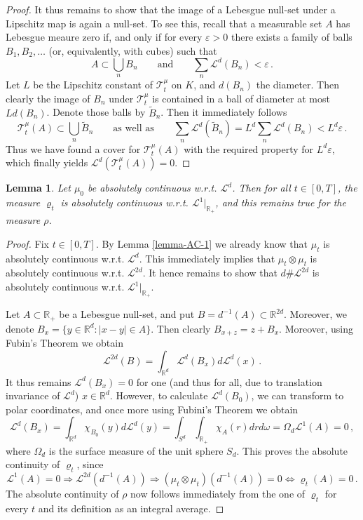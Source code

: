 \documentclass[A4paper,11pt]{article}
\newtheorem{lemma}[theorem]{Lemma}
\theoremstyle{definition}
\newcommand{\R}{\mathbb{R}}
\newcommand{\cl}{\mathcal{L}}
\newcommand{\ct}{\mathcal{T}}
\begin{document}
\begin{proof}
	It thus remains to show that the image of a Lebesgue null-set under a Lipschitz map is again a null-set. To see this,
	recall that a measurable set $A$ has Lebesgue meaure zero if, and only if for every $\varepsilon>0$ there exists a
	family of balls $B_1,B_2,\ldots$ (or, equivalently, with cubes) such that
	\[
		A\subset\bigcup_n B_n\qquad\text{and}\qquad\sum_n\cl^d(B_n)<\varepsilon\,.
	\]
	Let $L$ be the Lipschitz constant of $\ct^\mu_t$ on $K$, and $d(B_n)$ the diameter. Then clearly the image of
	$B_n$ under $\ct^\mu_t$ is contained in a ball of diameter at most $Ld(B_n)$. Denote those balls by
	$\widetilde B_n$.
	Then it immediately follows
	\[
		\ct^\mu_t(A)\subset\bigcup_n\widetilde B_n\qquad\text{as well as}\qquad
		\sum_n\cl^d(\widetilde B_n)=L^d\sum_n\cl^d(B_n)<L^d\varepsilon\,.
	\]
	Thus we have found a cover for $\ct^\mu_t(A)$ with the required property for $L^d\varepsilon$, which finally
	yields $\cl^d(\ct^\mu_t(A))=0$.
\end{proof}

\begin{lemma}
	Let $\mu_0$ be absolutely continuous w.r.t. $\cl^d$. Then for all $t\in [0,T]$, the measure $\varrho_t$ is absolutely
	continuous w.r.t. $\cl^1|_{\R_+}$, and this remains true for the measure $\rho$.
\end{lemma}

\begin{proof}
	Fix $t\in [0,T]$. By Lemma \ref{lemma-AC-1} we already know that $\mu_t$ is absolutely continuous w.r.t.
	$\cl^d$. This immediately implies that $\mu_t\otimes\mu_t$ is absolutely continuous w.r.t. $\cl^{2d}$. It hence
	remains to show that $d\#\cl^{2d}$ is absolutely continuous w.r.t. $\cl^1|_{\R_+}$.
	
	Let $A\subset\R_+$ be a Lebesgue null-set, and put $B=d^{-1}(A)\subset\R^{2d}$. Moreover, we denote
	$B_x=\{y\in\R^d:|x-y|\in A\}$. Then clearly $B_{x+z}=z+B_x$. Moreover, using Fubin's Theorem we obtain
	\[
		\cl^{2d}(B)=\int_{\R^d}\cl^d(B_x)d\cl^d(x)\,.
	\]
	It thus remains $\cl^d(B_x)=0$ for one (and thus for all, due to translation invariance of $\cl^d$) $x\in\R^d$.
	However, to calculate $\cl^d(B_0)$, we can transform to polar coordinates, and once more using Fubini's Theorem
	we obtain
	\[
		\cl^d(B_x)=\int_{\R^d}\chi_{B_0}(y)d\cl^d(y)
			=\int_{S^d}\int_{\R_+}\chi_A(r)dr d\omega=\Omega_d\cl^1(A)=0\,,
	\]
	where $\Omega_d$ is the surface measure of the unit sphere $S_d$. This proves the absolute continuity of
	$\varrho_t$, since
	\[
		\cl^1(A)=0\Longrightarrow\cl^{2d}(d^{-1}(A))
			\Longrightarrow (\mu_t\otimes\mu_t)(d^{-1}(A))=0\iff\varrho_t(A)=0\,.
	\]
	The absolute continuity of $\rho$ now follows immediately from the one of $\varrho_t$ for every $t$ and its
	definition as an integral average.
\end{proof}
\end{document}
